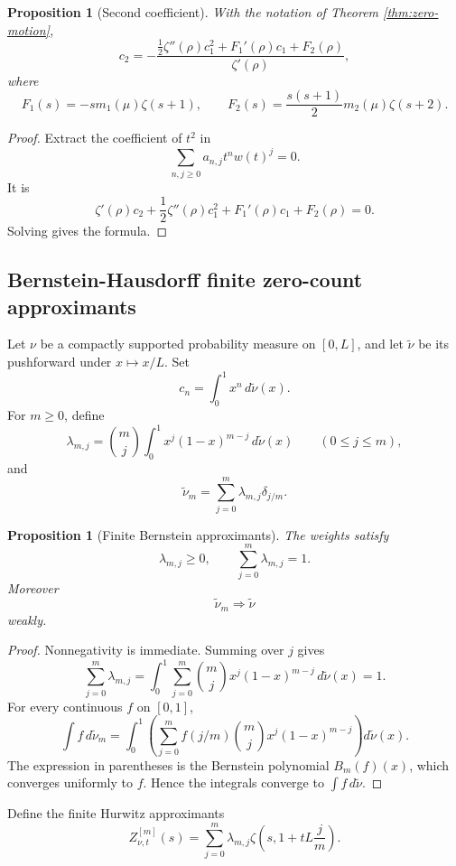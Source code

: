 \documentclass[11pt]{article}
\theoremstyle{plain}
\newtheorem{proposition}[theorem]{Proposition}
\theoremstyle{definition}
\begin{document}
\begin{proposition}[Second coefficient]\label{prop:second-coeff}
With the notation of Theorem \ref{thm:zero-motion},
\[
   c_2=-\frac{\frac12\zeta''(\rho)c_1^2+F_1'(\rho)c_1+F_2(\rho)}{\zeta'(\rho)},
\]
where
\[
   F_1(s)=-s m_1(\mu)\zeta(s+1),
   \qquad
   F_2(s)=\frac{s(s+1)}2m_2(\mu)\zeta(s+2).
\]
\end{proposition}

\begin{proof}
Extract the coefficient of \(t^2\) in
\[
   \sum_{n,j\ge0}a_{n,j}t^n w(t)^j=0.
\]
It is
\[
   \zeta'(\rho)c_2+\frac12\zeta''(\rho)c_1^2+F_1'(\rho)c_1+F_2(\rho)=0.
\]
Solving gives the formula.
\end{proof}

\subsection{Bernstein-Hausdorff finite zero-count approximants}

Let \(\nu\) be a compactly supported probability measure on \([0,L]\), and let \(\widetilde\nu\) be its pushforward under \(x\mapsto x/L\).  Set
\[
   c_n=\int_0^1x^n\,d\widetilde\nu(x).
\]
For \(m\ge0\), define
\[
   \lambda_{m,j}=\binom mj\int_0^1 x^j(1-x)^{m-j}\,d\widetilde\nu(x)
   \qquad(0\le j\le m),
\]
and
\[
   \widetilde\nu_m=\sum_{j=0}^m\lambda_{m,j}\delta_{j/m}.
\]

\begin{proposition}[Finite Bernstein approximants]\label{prop:bernstein}
The weights satisfy
\[
   \lambda_{m,j}\ge0,
   \qquad
   \sum_{j=0}^m\lambda_{m,j}=1.
\]
Moreover
\[
   \widetilde\nu_m\Rightarrow \widetilde\nu
\]
weakly.
\end{proposition}

\begin{proof}
Nonnegativity is immediate.  Summing over \(j\) gives
\[
   \sum_{j=0}^m\lambda_{m,j}
   =\int_0^1\sum_{j=0}^m\binom mjx^j(1-x)^{m-j}\,d\widetilde\nu(x)=1.
\]
For every continuous \(f\) on \([0,1]\),
\[
   \int f\,d\widetilde\nu_m
   =\int_0^1\left(\sum_{j=0}^m f(j/m)\binom mjx^j(1-x)^{m-j}\right)d\widetilde\nu(x).
\]
The expression in parentheses is the Bernstein polynomial \(B_m(f)(x)\), which converges uniformly to \(f\).  Hence the integrals converge to \(\int f\,d\widetilde\nu\).
\end{proof}

Define the finite Hurwitz approximants
\[
   Z_{\nu,t}^{[m]}(s)=\sum_{j=0}^m\lambda_{m,j}\zeta\left(s,1+tL\frac jm\right).
\]
\end{document}
